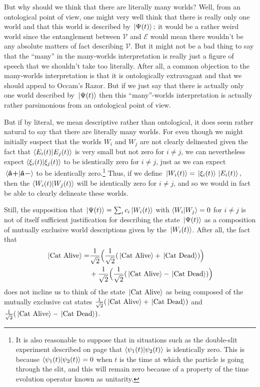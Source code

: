     But why should we think that there are literally many worlds? Well, from an ontological point of view, one might very well think that there is really only one world and that this world is described by $\ket*{\Psi(t)};$ it would be a rather weird world since the entanglement between $\mathcal{V}$ and $\mathcal{E}$ would mean there wouldn't be any absolute matters of fact describing $\mathcal{V}$. But it might not be a bad thing to say that the ``many'' in the many-worlds interpretation is really just a figure of speech that we shouldn't take too literally. After all, a common objection to the many-worlds interpretation is that it is ontologically extravagant and that we should appeal to Occam's Razor. But if we just say that there is actually only one world described by $\ket*{\Psi(t)}$ then this ``many''-worlds interpretation is actually rather parsimonious from an ontological point of view. 
    
    But if by literal, we mean descriptive rather than ontological, it does seem rather natural to say that there are literally many worlds. For even though we might initially suspect that the worlds $W_i$ and $W_j$ are not clearly delineated given the fact that $\ip{E_i(t)}{E_j(t)}$ is very small but not zero for $i\neq j$, we can nevertheless expect $\ip{\xi_i(t)}{\xi_j(t)}$ to be identically zero for $i\neq j$, { just as we can expect $\ip*{\uvbp{a}}{\uvbm{a}}$ to be identically zero.\footnote{It is also reasonable to suppose that in situations such as the double-slit experiment described on page \pageref{psi_slit} that $\ip{\psi_1(t)}{\psi_2(t)}$ is identically zero. This is because $\ip{\psi_1(t)}{\psi_2(t)}=0$ when $t$ is the time at which the particle is going through the slit, and this will remain zero because of a property of the time evolution operator known as unitarity.} Thus, if we define} $\ket*{W_i(t)}=\ket*{\xi_i(t)}\ket*{E_i(t)},$ then the $\ip{W_i(t)}{W_j(t)}$ will be identically zero for $i\neq j$, and so we would in fact be able to clearly delineate these worlds.
    
    Still, the supposition that $\ket*{\Psi(t)}= \sum_i c_i\ket*{W_i(t)}$  with $\ip{W_i}{W_j}=0$ for $i\neq j$ is not of itself sufficient justification for describing the state $\ket*{\Psi(t)}$ as a composition of mutually exclusive world descriptions given by the $\ket*{W_i(t)}$. After all, the fact that
    \begin{align*}\ket*{\text{Cat Alive}}= &\frac{1}{\sqrt{2}}\Big(\frac{1}{\sqrt{2}}(\ket*{\text{Cat Alive}}+\ket*{\text{Cat Dead}})\Big)\\&+\frac{1}{\sqrt{2}}\Big( \frac{1}{\sqrt{2}}(\ket*{\text{Cat Alive}}-\ket*{\text{Cat Dead}})\Big) \end{align*}
    \vspace{\alignstarspace pt}\newline
    does not incline us to think of the state $\ket*{\text{Cat Alive}}$ as being composed of the mutually exclusive cat states  $\frac{1}{\sqrt{2}}(\ket*{\text{Cat Alive}}+\ket*{\text{Cat Dead}})$ and $\frac{1}{\sqrt{2}}(\ket*{\text{Cat Alive}}-\ket*{\text{Cat Dead}})$. 
    

